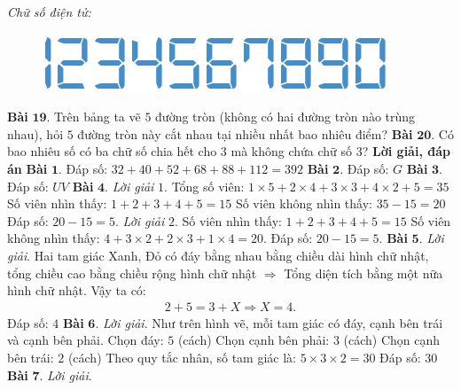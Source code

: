 \begin{multicols}{2}
	\vskip 0.1cm
	\textit{Chữ số điện tử:} 
	\begin{figure}[H]
		\centering
		\vspace*{-10pt}
		\captionsetup{labelformat= empty, justification=centering}
		\includegraphics[width=1\linewidth]{Bai18}
		\vspace*{-15pt}
	\end{figure}
	\textbf{\color{cackithi}Bài} $\pmb{19.}$ Trên bảng ta vẽ $5$ đường tròn (không có hai đường tròn nào trùng nhau), hỏi $5$ đường tròn này cắt nhau tại nhiều nhất bao nhiêu điểm? 
	\vskip 0.1cm
	\textbf{\color{cackithi}Bài} $\pmb{20.}$ Có bao nhiêu số có ba chữ số chia hết cho $3$ mà không chứa chữ số $3$?
	\vskip 0.1cm
	\textbf{\color{cackithi}Lời giải, đáp án}
	\vskip 0.1cm
	\textbf{\color{cackithi}Bài} $\pmb{1.}$ Đáp số: $32+40+52+68+88+112=392$
	\vskip 0.1cm
	\textbf{\color{cackithi}Bài} $\pmb{2.}$ Đáp số: $G$
	\vskip 0.1cm
	\textbf{\color{cackithi}Bài} $\pmb{3.}$ Đáp số: $UV$	 
	\vskip 0.1cm
	\textbf{\color{cackithi}Bài} $\pmb{4.}$
	\textit{Lời giải} $1$.
	Tổng số viên: $1\times5+2\times4+3\times3+4\times2+5 = 35$
	\vskip 0.1cm
	Số viên nhìn thấy: $1+2+3+4+5 = 15$
	\vskip 0.1cm
	Số viên không nhìn thấy: $35 - 15 = 20$
	\vskip 0.1cm
	Đáp số: $20 - 15 = 5$.
	\vskip 0.1cm
	\textit{Lời giải} $2$.
	Số viên nhìn thấy: $1+2+3+4+5 = 15$
	\vskip 0.1cm
	Số viên không nhìn thấy: $4 + 3\times2 + 2\times3 + 1\times4 = 20$.
	\vskip 0.1cm
	Đáp số: $20 - 15 = 5$.
	\vskip 0.1cm
	\textbf{\color{cackithi}Bài} $\pmb{5.}$ \textit{Lời giải}.
	Hai tam giác Xanh, Đỏ có đáy bằng nhau bằng chiều dài hình chữ nhật, tổng chiều cao bằng chiều rộng hình chữ nhật $\Rightarrow$ Tổng diện tích bằng một nữa hình chữ nhật. Vậy ta có:
	\begin{align*}
			2 + 5 = 3 + X \Rightarrow X = 4.
		\end{align*}
	Đáp số: $4$ 
	\vskip 0.1cm
	\textbf{\color{cackithi}Bài} $\pmb{6.}$ \textit{Lời giải}.
	Như trên hình vẽ, mỗi tam giác có đáy, cạnh bên trái và cạnh bên phải.
	\vskip 0.1cm
	Chọn đáy: $5$ (cách)
	\vskip 0.1cm
	Chọn cạnh bên phải: $3$ (cách) 
	\vskip 0.1cm
	Chọn cạnh bên trái: $2$ (cách) 
	\vskip 0.1cm
	Theo quy tắc nhân, số tam giác là: $5\times3\times2 = 30$
	\vskip 0.1cm
	Đáp số: $30$
	\vskip 0.1cm
	\textbf{\color{cackithi}Bài} $\pmb{7.}$ \textit{Lời giải}.
	\begin{figure}[H]

\end{figure}
\end{multicols}
